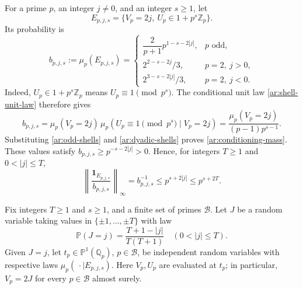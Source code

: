 \documentclass[twoside]{aomart}
\theoremstyle{paperplain}
\theoremstyle{paperdefinition}
\newcommand{\Z}{\mathbb Z}
\newcommand{\Q}{\mathbb Q}
\newcommand{\Pp}{\mathbb P}
\numberwithin{equation}{section}
\begin{document}
For a prime $p$, an integer $j\ne0$, and an integer $s\ge1$, let
\begin{equation*}
 E_{p,j,s}=\{V_p=2j,\ U_p\in1+p^s\Z_p\}.
\end{equation*}
Its probability is
\begin{equation}
 b_{p,j,s}:=\mu_p(E_{p,j,s})=
 \begin{cases}
 \dfrac2{p+1}p^{1-s-2|j|},&p\text{ odd},\\[3pt]
 2^{2-s-2j}/3,&p=2,\ j>0,\\
 2^{3-s-2|j|}/3,&p=2,\ j<0.
 \end{cases}
 \label{ar:conditioning-mass}
\end{equation}
Indeed, $U_p\in1+p^s\Z_p$ means $U_p\equiv1\pmod{p^s}$.
The conditional unit law \eqref{ar:shell-unit-law} therefore gives
\begin{equation*}
 b_{p,j,s}=\mu_p(V_p=2j)\,\mu_p(U_p\equiv1\pmod{p^s}\mid V_p=2j)
 =\frac{\mu_p(V_p=2j)}{(p-1)p^{s-1}}.
\end{equation*}
Substituting \eqref{ar:odd-shells} and \eqref{ar:dyadic-shells}
proves \eqref{ar:conditioning-mass}. These values satisfy
$b_{p,j,s}\ge p^{-s-2|j|}>0$. Hence, for integers $T\ge1$
and $0<|j|\le T$,
\begin{equation}
 \left\|\frac{\mathbf1_{E_{p,j,s}}}{b_{p,j,s}}\right\|_\infty
 =b_{p,j,s}^{-1}\le p^{s+2|j|}\le p^{s+2T}.
 \label{ar:conditioning-density-bound}
\end{equation}

Fix integers $T\ge1$ and $s\ge1$, and a finite set of primes
$\mathcal B$. Let $J$ be a random variable taking values in
$\{\pm1,\ldots,\pm T\}$ with law
\begin{equation}
 \Pp(J=j)=\frac{T+1-|j|}{T(T+1)}
 \quad(0<|j|\le T).
 \label{ar:label-law}
\end{equation}
Given $J=j$, let $t_p\in\mathbb P^1(\Q_p)$, $p\in\mathcal B$,
be independent random variables with respective laws
$\mu_p(\,\cdot\mid E_{p,j,s})$.
Here $V_p,U_p$ are evaluated at $t_p$; in particular,
$V_p=2J$ for every $p\in\mathcal B$ almost surely.
\end{document}
